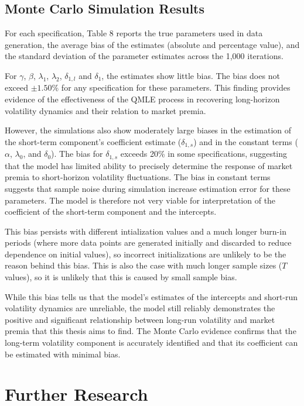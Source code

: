 \documentclass[12pt]{article}
\begin{document}
\subsection{Monte Carlo Simulation Results}
For each specification, Table 8 reports the true parameters used in data generation, the average bias of the estimates (absolute and percentage value), and the standard deviation of the parameter estimates across the 1,000 iterations.\par
For $\gamma$, $\beta$, $\lambda_1$, $\lambda_2$, $\delta_{1,l}$ and $\delta_1$, the estimates show little bias. The bias does not exceed $\pm1.50\%$ for any specification for these parameters. This finding provides evidence of the effectiveness of the QMLE process in recovering long-horizon volatility dynamics and their relation to market premia.\par
However, the simulations also show moderately large biases in the estimation of the short-term component's coefficient estimate ($\delta_{1,s}$) and in the constant terms ($\alpha$, $\lambda_0$, and $\delta_0$). The bias for $\delta_{1,s}$ exceeds 20\% in some specifications, suggesting that the model has limited ability to precisely determine the response of market premia to short-horizon volatility fluctuations. The bias in constant terms suggests that sample noise during simulation increase estimation error for these parameters. The model is therefore not very viable for interpretation of the coefficient of the short-term component and the intercepts.\par
This bias persists with different intialization values and a much longer burn-in periods (where more data points are generated initially and discarded to reduce dependence on initial values), so incorrect initializations are unlikely to be the reason behind this bias. This is also the case with much longer sample sizes ($T$ values), so it is unlikely that this is caused by small sample bias.\par
While this bias tells us that the model's estimates of the intercepts and short-run volatility dynamics are unreliable, the model still reliably demonstrates the positive and significant relationship between long-run volatility and market premia that this thesis aims to find. The Monte Carlo evidence confirms that the long-term volatility component is accurately identified and that its coefficient can be estimated with minimal bias.

\section{Further Research}
\end{document}
